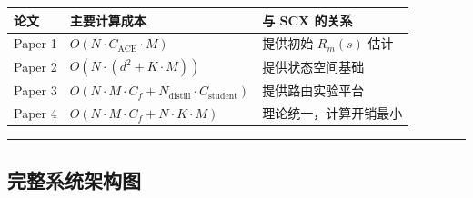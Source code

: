 \documentclass[
  12pt,
]{ctexart}
\begin{document}
\begin{longtable}[]{@{}
  >{\raggedright\arraybackslash}p{}
  >{\raggedright\arraybackslash}p{}
  >{\raggedright\arraybackslash}p{}@{}}
\toprule\noalign{}
\begin{minipage}[b]{\linewidth}\raggedright
论文
\end{minipage} & \begin{minipage}[b]{\linewidth}\raggedright
主要计算成本
\end{minipage} & \begin{minipage}[b]{\linewidth}\raggedright
与 SCX 的关系
\end{minipage} \\
\midrule\noalign{}
\endhead
\bottomrule\noalign{}
\endlastfoot
Paper 1 & \(O(N \cdot C_{\text{ACE}} \cdot M)\) & 提供初始 \(R_m(s)\)
估计 \\
Paper 2 & \(O(N \cdot (d^2 + K \cdot M))\) & 提供状态空间基础 \\
Paper 3 &
\(O(N \cdot M \cdot C_f + N_{\text{distill}} \cdot C_{\text{student}})\)
& 提供路由实验平台 \\
Paper 4 & \(O(N \cdot M \cdot C_f + N \cdot K \cdot M)\) &
理论统一，计算开销最小 \\
\end{longtable}

\begin{center}\rule{0.5\linewidth}{0.5pt}\end{center}

\subsection{完整系统架构图}\label{ux5b8cux6574ux7cfbux7edfux67b6ux6784ux56fe}
\end{document}
